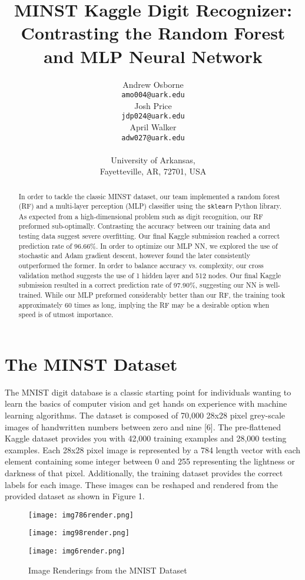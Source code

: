 \documentclass{article}
\title{MINST Kaggle Digit Recognizer: Contrasting the Random Forest and MLP Neural Network}
\author{%
   Andrew Osborne \\
   \texttt{amo004@uark.edu} \\
   \And
   Josh Price \\
   \texttt{jdp024@uark.edu} \\
   \AND
   April Walker \\
   \texttt{adw027@uark.edu} \\
   \\
   University of Arkansas, \\
   Fayetteville, AR, 72701, USA
}
\begin{document}

\maketitle

\begin{abstract}
  In order to tackle the classic MINST dataset, our team implemented a random forest (RF) and a multi-layer perception (MLP) classifier using the \verb+sklearn+ Python library. As expected from a high-dimensional problem such as digit recognition, our RF preformed sub-optimally. Contrasting the accuracy between our training data and testing data suggest severe overfitting. Our final Kaggle submission reached a correct prediction rate of 96.66\%. In order to optimize our MLP NN, we explored the use of stochastic and Adam gradient descent, however found the later consistently outperformed the former. In order to balance accuracy vs. complexity, our cross validation method suggests the use of 1 hidden layer and 512 nodes. Our final Kaggle submission resulted in a correct prediction rate of 97.90\%, suggesting our NN is well-trained. While our MLP preformed considerably better than our RF, the training took approximately 60 times as long, implying the RF may be a desirable option when speed is of utmost importance. 
\end{abstract}

\section{The MINST Dataset}
The MNIST digit database is a classic starting point for individuals wanting to learn the basics of computer vision and get hands on experience with machine learning algorithms. The dataset is composed of 70,000 28x28 pixel grey-scale images of handwritten numbers between zero and nine [6]. The pre-flattened Kaggle dataset provides you with 42,000 training examples and 28,000 testing examples. Each 28x28 pixel image is represented by a 784 length vector with each element containing some integer between 0 and 255 representing the lightness or darkness of that pixel. Additionally, the training dataset provides the correct labels for each image. These images can be reshaped and rendered from the provided dataset as shown in Figure 1. 
\begin{figure}[h]
  \centering
    \begin{minipage}[t]{0.3\textwidth}
        \texttt{[image: img786render.png]}
    \end{minipage}
    \begin{minipage}[t]{0.3\textwidth}
        \texttt{[image: img98render.png]}
    \end{minipage}
    \begin{minipage}[t]{0.3\textwidth}
        \texttt{[image: img6render.png]}
    \end{minipage}
  \caption{Image Renderings from the MNIST Dataset}
\end{figure}
\end{document}
